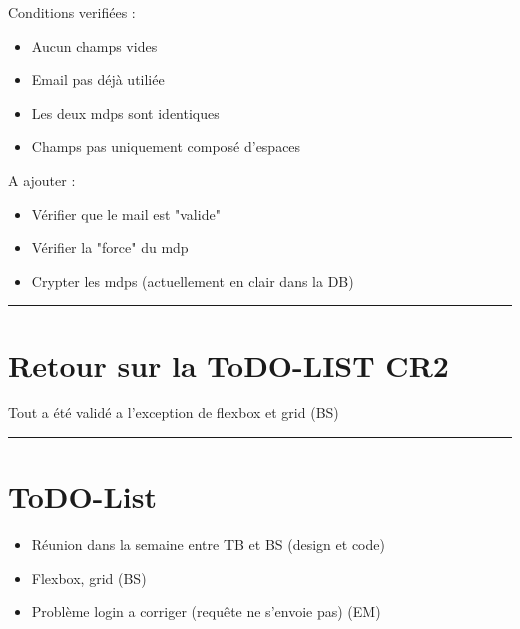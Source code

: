 \documentclass[10pt,a4paper]{report}
\begin{document}
\noindent Conditions verifiées :
\begin{itemize}
        \item Aucun champs vides
        \item Email pas déjà utiliée
        \item Les deux mdps sont identiques
        \item Champs pas uniquement composé d'espaces
\end{itemize}
A ajouter : 
\begin{itemize}
        \item Vérifier que le mail est "valide"
        \item Vérifier la "force" du mdp
        \item Crypter les mdps (actuellement en clair dans la DB)
\end{itemize}

\noindent\rule{\linewidth}{0.5mm} \bigskip
\section{Retour sur la ToDO-LIST CR2}
Tout a été validé a l'exception de flexbox et grid (BS)

\noindent\rule{\linewidth}{0.5mm} \bigskip
\section{ToDO-List}
\begin{itemize}
        \item Réunion dans la semaine entre TB et BS (design et code)
        \item Flexbox, grid (BS)
        \item Problème login a corriger (requête ne s'envoie pas) (EM)
\end{itemize}
\end{document}
